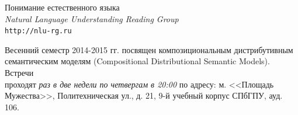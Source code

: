 \documentclass[12pt]{article}
\begin{document}
\baselineskip 15pt

\parindent 0cm


\begin{center}
{\rm \Huge{Понимание естественного языка}}\\
\medskip
{\rm \Large \textit{Natural Language Understanding Reading Group}}\\
\medskip
{\rm \Large \texttt{http://nlu-rg.ru}}
\end{center}

\bigskip

\baselineskip 12pt

Весенний семестр 2014-2015 гг. посвящен композициональным дистрибутивным \\семантическим моделям (Compositional Distributional Semantic Models). Встречи \\проходят \textit{раз в две недели по четвергам в 20:00} по адресу: м. <<Площадь Мужества>>, Политехническая ул., д. 21, 9-й учебный корпус СПбГПУ, ауд. 106.\\

\end{document}
